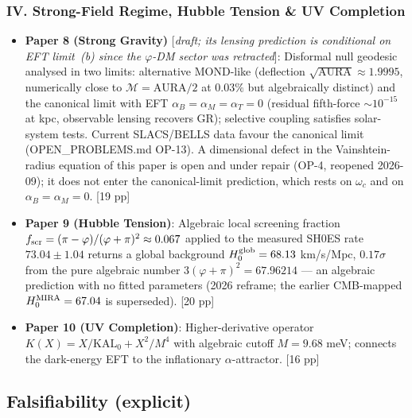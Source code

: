 \documentclass[11pt,a4paper]{article}
\begin{document}
\subsubsection*{IV. Strong-Field Regime, Hubble Tension \& UV Completion}
\begin{itemize}
  \item \textbf{Paper 8 (Strong Gravity)} [\emph{draft; its lensing prediction is conditional on EFT limit~(b) since the $\varphi$-DM sector was retracted}]: Disformal null geodesic analysed in
  two limits: alternative MOND-like (deflection $\sqrt{\text{AURA}}\approx 1.9995$,
  numerically close to $\mathcal{M}=\text{AURA}/2$ at $0.03\%$ but algebraically
  distinct) and the canonical limit with EFT $\alpha_B=\alpha_M=\alpha_T=0$
  (residual fifth-force $\sim 10^{-15}$ at kpc, observable lensing recovers GR);
  selective coupling satisfies solar-system tests. Current SLACS/BELLS data
  favour the canonical limit (OPEN\_PROBLEMS.md OP-13). A dimensional defect in
  the Vainshtein-radius equation of this paper is open and under repair
  (OP-4, reopened 2026-09); it does not enter the canonical-limit prediction,
  which rests on $\omega_c$ and on $\alpha_B=\alpha_M=0$. [19 pp]
  \item \textbf{Paper 9 (Hubble Tension)}: Algebraic local screening fraction
  $f_{\rm scr}=(\pi-\varphi)/(\varphi+\pi)^2\approx0.067$ applied to the
  measured SH0ES rate $73.04\pm1.04$ returns a global background
  $H_0^{\rm glob}=68.13$ km/s/Mpc, $0.17\sigma$ from the pure algebraic number
  $3(\varphi+\pi)^2=67.96214$ --- an algebraic
  prediction with no fitted parameters (2026 reframe; the earlier CMB-mapped
  $H_0^{\rm MIRA}=67.04$ is superseded). [20 pp]
  \item \textbf{Paper 10 (UV Completion)}: Higher-derivative operator
  $K(X)=X/\mathrm{KAL}_0+X^2/M^4$ with algebraic cutoff $M=9.68$ meV; connects
  the dark-energy EFT to the inflationary $\alpha$-attractor. [16 pp]
\end{itemize}

\subsection*{Falsifiability (explicit)}
\end{document}
